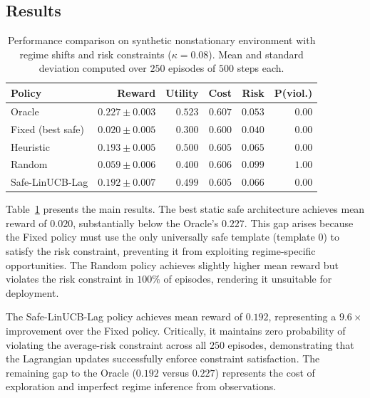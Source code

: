 \documentclass[sigconf,anonymous]{acmart}
\newcommand{\tabref}[1]{Table~\ref{#1}}
\begin{document}
\subsection{Results}

\begin{table}[t]
\centering
\caption{Performance comparison on synthetic nonstationary environment with regime shifts and risk constraints ($\kappa = 0.08$). Mean and standard deviation computed over $250$ episodes of $500$ steps each.}
\label{tab:results}
\begin{tabular}{lrrrrr}
\toprule
Policy & Reward & Utility & Cost & Risk & P(viol.) \\
\midrule
Oracle & $0.227 \pm 0.003$ & $0.523$ & $0.607$ & $0.053$ & $0.00$ \\
Fixed (best safe) & $0.020 \pm 0.005$ & $0.300$ & $0.600$ & $0.040$ & $0.00$ \\
Heuristic & $0.193 \pm 0.005$ & $0.500$ & $0.605$ & $0.065$ & $0.00$ \\
Random & $0.059 \pm 0.006$ & $0.400$ & $0.606$ & $0.099$ & $1.00$ \\
Safe-LinUCB-Lag & $0.192 \pm 0.007$ & $0.499$ & $0.605$ & $0.066$ & $0.00$ \\
\bottomrule
\end{tabular}
\end{table}

\tabref{tab:results} presents the main results. The best static safe architecture achieves mean reward of $0.020$, substantially below the Oracle's $0.227$. This gap arises because the Fixed policy must use the only universally safe template (template $0$) to satisfy the risk constraint, preventing it from exploiting regime-specific opportunities. The Random policy achieves slightly higher mean reward but violates the risk constraint in $100\%$ of episodes, rendering it unsuitable for deployment.

The Safe-LinUCB-Lag policy achieves mean reward of $0.192$, representing a $9.6\times$ improvement over the Fixed policy. Critically, it maintains zero probability of violating the average-risk constraint across all $250$ episodes, demonstrating that the Lagrangian updates successfully enforce constraint satisfaction. The remaining gap to the Oracle ($0.192$ versus $0.227$) represents the cost of exploration and imperfect regime inference from observations.
\end{document}
